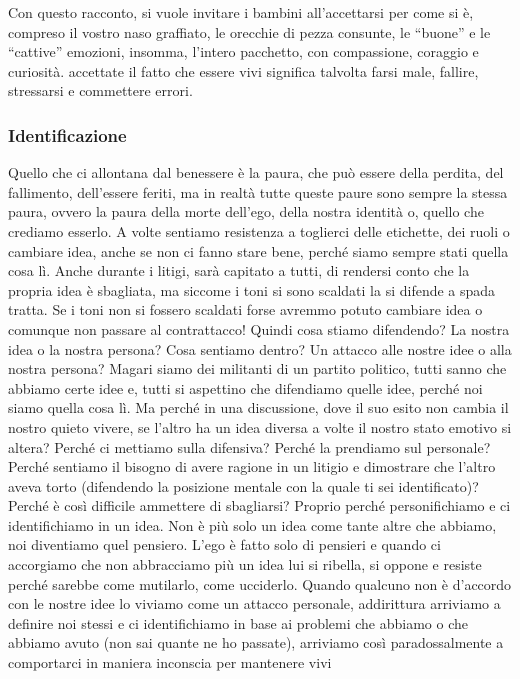 \documentclass[12pt]{book} %
\begin{document}
Con questo racconto, si vuole invitare i bambini all'accettarsi per come si è, compreso il vostro
naso graffiato, le orecchie di pezza consunte, le “buone” e le “cattive” emozioni, insomma,
l'intero pacchetto, con compassione, coraggio e curiosità. accettate il fatto che essere vivi
significa talvolta farsi male, fallire, stressarsi e commettere errori. 

\subsubsection{Identificazione}
Quello che ci allontana dal benessere è la paura, che può essere della perdita, del fallimento,
dell'essere feriti, ma in realtà tutte queste paure sono sempre la stessa paura, ovvero la paura
della morte dell'ego, della nostra identità o, quello che crediamo esserlo. A volte sentiamo
resistenza a toglierci delle etichette, dei ruoli o cambiare idea, anche se non ci fanno stare bene, perché siamo
sempre stati quella cosa lì. Anche durante i litigi, sarà capitato a tutti, di rendersi conto che la propria idea è
sbagliata, ma siccome i toni si sono scaldati la si difende a spada tratta. Se i toni non si fossero scaldati forse
avremmo potuto cambiare idea o comunque non passare al contrattacco! Quindi cosa stiamo difendendo? La nostra idea o la
nostra persona? Cosa sentiamo dentro? Un attacco alle nostre idee o alla nostra persona? Magari siamo dei militanti di
un partito politico, tutti sanno che abbiamo certe idee e, tutti si aspettino che difendiamo quelle idee, perché noi
siamo quella cosa lì. Ma perché in una discussione, dove il suo esito non cambia il nostro quieto vivere, se
l'altro ha un idea diversa a volte il nostro stato emotivo si altera? Perché ci mettiamo sulla
difensiva? Perché la prendiamo sul personale? Perché sentiamo il bisogno di avere ragione in un litigio e dimostrare
che l'altro aveva torto (difendendo la posizione mentale con la quale ti sei identificato)? Perché
è così difficile ammettere di sbagliarsi? Proprio perché personifichiamo e ci identifichiamo in un idea. Non è più solo
un idea come tante altre che abbiamo, noi diventiamo quel pensiero. L'ego è fatto solo di pensieri
e quando ci accorgiamo che non abbracciamo più un idea lui si ribella, si oppone e resiste perché sarebbe come
mutilarlo, come ucciderlo. Quando qualcuno non è d'accordo con le nostre idee lo viviamo come un attacco personale,
addirittura arriviamo a definire noi stessi e ci identifichiamo in base ai problemi che abbiamo o che abbiamo avuto
(non sai quante ne ho passate), arriviamo così paradossalmente a comportarci in maniera inconscia per mantenere vivi
\end{document}
